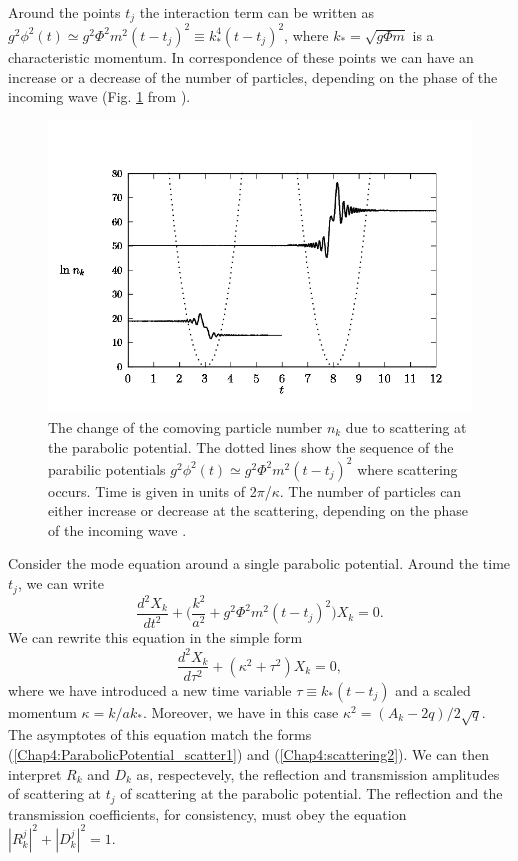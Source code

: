 \documentclass[11pt,a4paper,twoside]{book}
\begin{document}
Around the points $ t_{j} $ the interaction term can be written as $ g^{2}\phi^{2}(t) \simeq g^{2}\Phi^{2}m^{2}(t-t_{j})^{2} \equiv k_{*}^{4}(t-t_{j})^{2} $, where $ k_{*}=\sqrt{g\Phi m} $ is a characteristic momentum. In correspondence of these points we can have an increase or a decrease of the number of particles, depending on the phase of the incoming wave (Fig. \ref{fig:lindefig8} from \cite{Chap4:LindePreheatingModel}).

\begin{figure}
	\centering
	\includegraphics[width=0.65\linewidth, height=0.4\textheight]{Images/Chap4/Linde_Fig8}
	\caption{The change  of the comoving particle number $ n_{k} $ due to scattering at the parabolic potential. The dotted lines show the sequence of the parabilic potentials $ g^{2}\phi^{2}(t) \simeq g^{2}\Phi^{2}m^{2}(t-t_{j})^{2} $ where scattering occurs. Time is given in units of 2$\pi$/$\kappa$. The number of particles can either increase or decrease at the scattering, depending on the phase of the incoming wave \cite{Chap4:LindePreheatingModel}.}
	\label{fig:lindefig8}
\end{figure}
Consider the mode equation around a single parabolic potential. Around the time $ t_{j} $, we can write
\begin{equation}
	\label{Chap4:EquationXkAroundtj}
	\frac{d^{2}X_{k}}{dt^{2}} + \Bigg(\frac{k^{2}}{a^{2}} + g^{2}\Phi^{2}m^{2}(t-t_{j})^{2}\Bigg)X_{k}=0.
\end{equation}
We can rewrite this equation in the simple form 
\begin{equation}
	\label{Chap4:EquationXkAround2}
	\frac{d^{2}X_{k}}{d\tau^{2}} + (\kappa^{2} + \tau^{2})X_{k}=0,
\end{equation}
where we have introduced a new time variable $ \tau \equiv k_{*}(t-t_{j}) $ and a scaled momentum $ \kappa = k/ak_{*} $. Moreover, we have in this case $ \kappa^{2} = (A_{k}-2q)/2\sqrt{q} $. The asymptotes of this equation match the forms (\ref{Chap4:ParabolicPotential_scatter1}) and (\ref{Chap4:scattering2}). We can then interpret $ R_{k} $ and $ D_{k} $ as, respectevely, the reflection and transmission amplitudes of scattering at $ t_{j} $ of scattering at the parabolic potential. The reflection and the transmission coefficients, for consistency, must obey the equation $ |R_{k}^{j}|^{2}  +  |D_{k}^{j}|^{2} = 1$.
\end{document}
